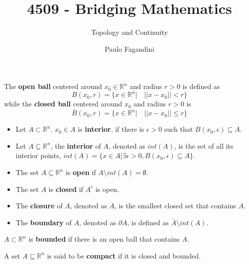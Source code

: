 \documentclass[aspectratio=169, handout]{beamer}
\title[]{4509 - Bridging Mathematics}
\subtitle{Topology and Continuity}
\author[P. Fagandini]{Paulo Fagandini}
\institute{}
\date{}
\begin{document}
\begin{frame}
   \begin{definition}
    The \textbf{open ball} centered around $x_0\in\mathds{R}^n$ and radius $r>0$ is defined as $$B(x_0,r)=\{x\in\mathds{R}^n | \quad ||x-x_0||<r\}$$ while the \textbf{closed ball} centered around $x_0$ and radius $r>0$ is $$\overline{B}(x_0,r)=\{x\in\mathds{R}^n| \quad ||x-x_0||\leq r\}$$
   \end{definition}
\end{frame}

\begin{frame}
    \begin{definition}
    \begin{itemize}
        \item Let $A\subset\mathds{R}^n$. $x_0\in A$ is \textbf{interior}, if there is $\epsilon>0$ such that $B(x_0,\epsilon)\subseteq A$.
        \item Let $A\subseteq \mathds{R}^n$, the \textbf{interior} of $A$, denoted as $int(A)$, is the set of all its interior points, $int(A)=\{x\in A|\exists\epsilon>0,B(x_0,\epsilon)\subseteq A\}$.
        \item The set $A\subseteq\mathds{R}^n$ is \textbf{open} if $A\setminus int(A)=\emptyset$.
        \item The set $A$ is \textbf{closed} if $A^c$ is open.
    \end{itemize}
    \end{definition}
\end{frame}

\begin{frame}

\begin{definition}
    \begin{itemize}
    \item The \textbf{closure} of $A$, denoted as $\overline{A}$, is the smallest closed set that contains $A$.
    \item The \textbf{boundary} of $A$, denoted as $\partial A$, is defined as $\overline{A}\setminus int(A)$.
    \end{itemize}
\end{definition}

\begin{definition}
    $A\subset\mathds{R}^n$ is \textbf{bounded} if there is an open ball that contains $A$.
\end{definition}
    
\begin{definition}
    A set $A\subseteq\mathds{R}^n$ is said to be \textbf{compact} if it is closed and bounded.
\end{definition}    
    
\end{frame}
\end{document}
